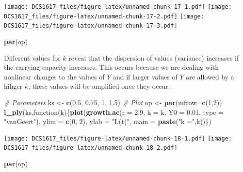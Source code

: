 \documentclass[]{book}
\newenvironment{Shaded}{\begin{snugshade}}{\end{snugshade}}
\newcommand{\KeywordTok}[1]{\textcolor[rgb]{0.13,0.29,0.53}{\textbf{{#1}}}}
\newcommand{\DataTypeTok}[1]{\textcolor[rgb]{0.13,0.29,0.53}{{#1}}}
\newcommand{\DecValTok}[1]{\textcolor[rgb]{0.00,0.00,0.81}{{#1}}}
\newcommand{\FloatTok}[1]{\textcolor[rgb]{0.00,0.00,0.81}{{#1}}}
\newcommand{\StringTok}[1]{\textcolor[rgb]{0.31,0.60,0.02}{{#1}}}
\newcommand{\CommentTok}[1]{\textcolor[rgb]{0.56,0.35,0.01}{\textit{{#1}}}}
\newcommand{\NormalTok}[1]{{#1}}
\begin{document}
\texttt{[image: DCS1617\_files/figure-latex/unnamed-chunk-17-1.pdf]}
\texttt{[image: DCS1617\_files/figure-latex/unnamed-chunk-17-2.pdf]}
\texttt{[image: DCS1617\_files/figure-latex/unnamed-chunk-17-3.pdf]}

\begin{Shaded}
\begin{Highlighting}[]
\KeywordTok{par}\NormalTok{(op)}
\end{Highlighting}
\end{Shaded}

Different values for \(k\) reveal that the dispersion of values
(variance) increases if the carrying capacity increases. This occurs
because we are dealing with nonlinear changes to the values of \(Y\) and
if larger values of \(Y\) are allowed by a hihger \(k\), these values
will be amplified once they occur.

\begin{Shaded}
\begin{Highlighting}[]
\CommentTok{# Parameters}
\NormalTok{ks <-}\StringTok{ }\KeywordTok{c}\NormalTok{(}\FloatTok{0.5}\NormalTok{, }\FloatTok{0.75}\NormalTok{, }\DecValTok{1}\NormalTok{, }\FloatTok{1.5}\NormalTok{)}
\CommentTok{# Plot }
\NormalTok{op <-}\StringTok{ }\KeywordTok{par}\NormalTok{(}\DataTypeTok{mfrow=}\KeywordTok{c}\NormalTok{(}\DecValTok{1}\NormalTok{,}\DecValTok{2}\NormalTok{))}
\KeywordTok{l_ply}\NormalTok{(ks,function(k)\{}\KeywordTok{plot}\NormalTok{(}\KeywordTok{growth.ac}\NormalTok{(}\DataTypeTok{r =} \FloatTok{2.9}\NormalTok{, }\DataTypeTok{k =} \NormalTok{k, }\DataTypeTok{Y0 =} \FloatTok{0.01}\NormalTok{, }\DataTypeTok{type =} \StringTok{"vanGeert"}\NormalTok{),}
                          \DataTypeTok{ylim =} \KeywordTok{c}\NormalTok{(}\DecValTok{0}\NormalTok{, }\DecValTok{2}\NormalTok{), }\DataTypeTok{ylab =} \StringTok{"L(t)"}\NormalTok{, }\DataTypeTok{main =} \KeywordTok{paste}\NormalTok{(}\StringTok{"k ="}\NormalTok{,k))\})}
\end{Highlighting}
\end{Shaded}

\texttt{[image: DCS1617\_files/figure-latex/unnamed-chunk-18-1.pdf]}
\texttt{[image: DCS1617\_files/figure-latex/unnamed-chunk-18-2.pdf]}

\begin{Shaded}
\begin{Highlighting}[]
\KeywordTok{par}\NormalTok{(op)}
\end{Highlighting}
\end{Shaded}
\end{document}
